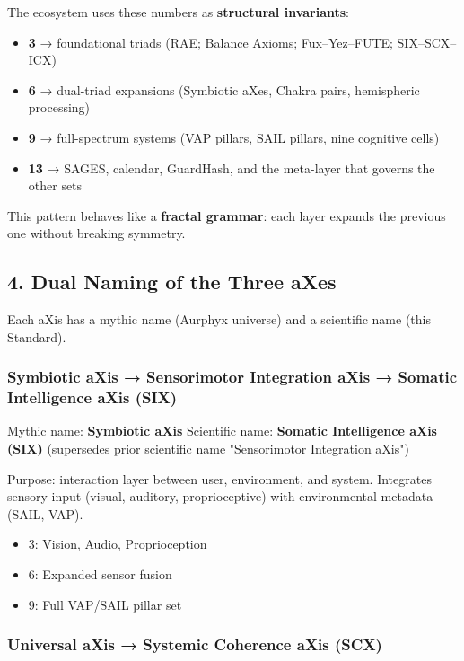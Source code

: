 The ecosystem uses these numbers as \textbf{structural invariants}:

\begin{itemize}
\tightlist
\item
  \textbf{3} → foundational triads (RAE; Balance Axioms; Fux--Yez--FUTE; SIX--SCX--ICX)
\item
  \textbf{6} → dual-triad expansions (Symbiotic aXes, Chakra pairs, hemispheric processing)
\item
  \textbf{9} → full-spectrum systems (VAP pillars, SAIL pillars, nine cognitive cells)
\item
  \textbf{13} → SAGES, calendar, GuardHash, and the meta-layer that governs the other sets
\end{itemize}

This pattern behaves like a \textbf{fractal grammar}: each layer expands the previous one without breaking symmetry.

\subsection{4. Dual Naming of the Three aXes}\label{dual-naming-of-the-three-axes}

Each aXis has a mythic name (Aurphyx universe) and a scientific name (this Standard).

\subsubsection{Symbiotic aXis → Sensorimotor Integration aXis → Somatic Intelligence aXis (SIX)}\label{symbiotic-axis-sensorimotor-integration-axis-six}

Mythic name: \textbf{Symbiotic aXis} Scientific name: \textbf{Somatic Intelligence aXis (SIX)} (supersedes prior scientific name "Sensorimotor Integration aXis")

Purpose: interaction layer between user, environment, and system. Integrates sensory input (visual, auditory, proprioceptive) with environmental metadata (SAIL, VAP).

\begin{itemize}
\tightlist
\item
  3: Vision, Audio, Proprioception
\item
  6: Expanded sensor fusion
\item
  9: Full VAP/SAIL pillar set
\end{itemize}

\subsubsection{Universal aXis → Systemic Coherence aXis (SCX)}\label{universal-axis-systemic-coherence-axis-scx}

